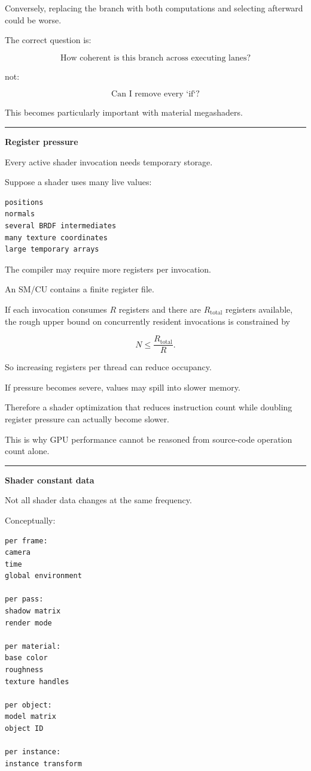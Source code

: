 Conversely, replacing the branch with both computations and selecting afterward could be worse.

The correct question is:

\[
\text{How coherent is this branch across executing lanes?}
\]

not:

\[
\text{Can I remove every `if`?}
\]

This becomes particularly important with material megashaders.

\begin{center}\rule{0.5\linewidth}{0.5pt}\end{center}

\textbf{Register pressure}

Every active shader invocation needs temporary storage.

Suppose a shader uses many live values:

\begin{verbatim}
positions
normals
several BRDF intermediates
many texture coordinates
large temporary arrays
\end{verbatim}

The compiler may require more registers per invocation.

An SM/CU contains a finite register file.

If each invocation consumes \(R\) registers and there are \(R_{\text{total}}\) registers available, the rough upper bound on concurrently resident invocations is constrained by

\[
N
\le
\frac{R_{\text{total}}}{R}.
\]

So increasing registers per thread can reduce occupancy.

If pressure becomes severe, values may spill into slower memory.

Therefore a shader optimization that reduces instruction count while doubling register pressure can actually become slower.

This is why GPU performance cannot be reasoned from source-code operation count alone.

\begin{center}\rule{0.5\linewidth}{0.5pt}\end{center}

\textbf{Shader constant data}

Not all shader data changes at the same frequency.

Conceptually:

\begin{verbatim}
per frame:
camera
time
global environment

per pass:
shadow matrix
render mode

per material:
base color
roughness
texture handles

per object:
model matrix
object ID

per instance:
instance transform
\end{verbatim}

